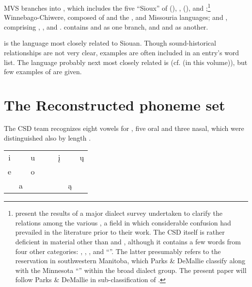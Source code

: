 \documentclass[output=paper]{LSP/langsci}
\begin{document}
MVS branches into , which includes the five ``Sioux''  of  (), ,  (),  and ;\footnote{\citet{ParksDeMallie1992} present the results of a major dialect survey undertaken to clarify the relations among the various  , a field in which considerable confusion had prevailed in the literature prior to their work.  The CSD itself is rather deficient in  material other than  and , although it contains a few words from four other categories: , , , and ``''.  The latter presumably refers to the  reservation in southwestern Manitoba, which Parks \& DeMallie classify along with the Minnesota ``'' within the broad  dialect group.  The present paper will follow Parks \& DeMallie in sub-classification of .}  Winnebago-Chiwere, composed of  and the ,  and Missouria languages; and , comprising , ,  and .   contains  and  as one branch, and  and  as another.

 is the language most closely related to Siouan.  Though sound-historical relationships are not very clear,  examples are often included in an entry's word list.  The language probably next most closely related is  (cf. \citealt{Kasak2016} (in this volume)), but few examples of  are given.


\section{The Reconstructed  phoneme set}

The CSD team recognizes eight vowels for , five oral and three nasal, which were distinguished also by length \citep{RankinEtAl1998}.%
 

\begin{center}
\begin{tabular}[t]{c c c c c c c c} 
i &  & u &&& \k{i} &    & \k{u}\\

e &  & o \\

 & a &   &&&      & \k{a} \\ 
\end{tabular}
\end{center}		
\end{document}
